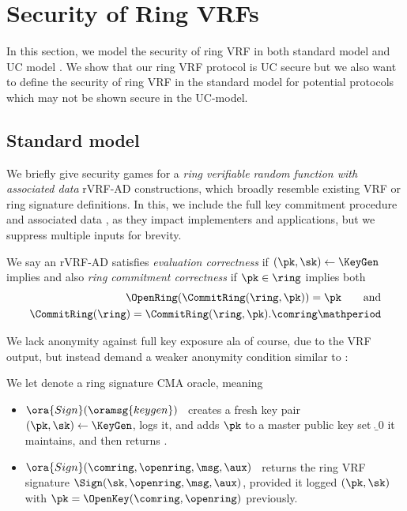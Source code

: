 
\section{Security of Ring VRFs}

In this section, we model the security of ring VRF in both standard model and UC model \cite{canetti1,canetti2}. We show that our ring VRF protocol is UC secure but we also want to define the security of ring VRF in the standard model for potential protocols which may not be shown secure in the UC-model. 

\subsection{Standard model}
\label{subsec:rvrf_games}

We briefly give security games for a {\em ring verifiable random
function with associated data} rVRF-AD constructions, which broadly
resemble existing VRF or ring signature definitions.  In this,
we include the full key commitment procedure and associated data \aux,
as they impact implementers and applications, but we suppress multiple inputs for brevity.


\begin{definition}
We say an rVRF-AD satisfies {\em evaluation correctness} if
$(\pk,\sk) \leftarrow \KeyGen$ implies
\def\tmpC{\Eval(\sk,\msg) = \Verify(\pk,\msg,\aux,\Sign(\sk,\msg,\aux))}
\eprint{$\tmpC$, succeeds}{$$ \tmpC, $$}
and also {\em ring commitment correctness} if
$\pk \in \ring$ implies both
\def\tmpA{\OpenRing(\CommitRing(\ring,\pk)) = \pk}
\def\tmpB{\CommitRing(\ring) = \CommitRing(\ring,\pk).\comring} %
\eprint{$$ \tmpA \quad\textrm{and}\quad \tmpB \mathperiod $$}%
{$$ \begin{aligned}
   \tmpA \qquad\textrm{and} \\
   \tmpB \mathperiod
\end{aligned} $$}
\end{definition}

We lack anonymity against full key exposure ala
 \cite[pp. 6 Def. 4]{cryptoeprint:2005:304} of course, due to the VRF output,
but instead demand a weaker anonymity condition similar to
 \cite[pp. 5 Def. 3]{cryptoeprint:2005:304}:

\begin{definition}\label{def:rvrf_sign_oracle}
We let  denote a ring signature CMA oracle, meaning
\begin{itemize}
\item $\ora{Sign}(\oramsg{keygen})$ \, 
 creates a fresh key pair $(\pk,\sk) \leftarrow \KeyGen$, logs it, and
 adds $\pk$ to a master public key set $\ring_0$ it maintains, and then
 returns \pk.
\item $\ora{Sign}(\comring,\openring,\msg,\aux)$ \,
 returns the ring VRF signature $\Sign(\sk,\openring,\msg,\aux)$,
 provided it logged $(\pk,\sk)$ with $\pk = \OpenKey(\comring,\openring)$ previously.
\end{itemize}
\end{definition}

